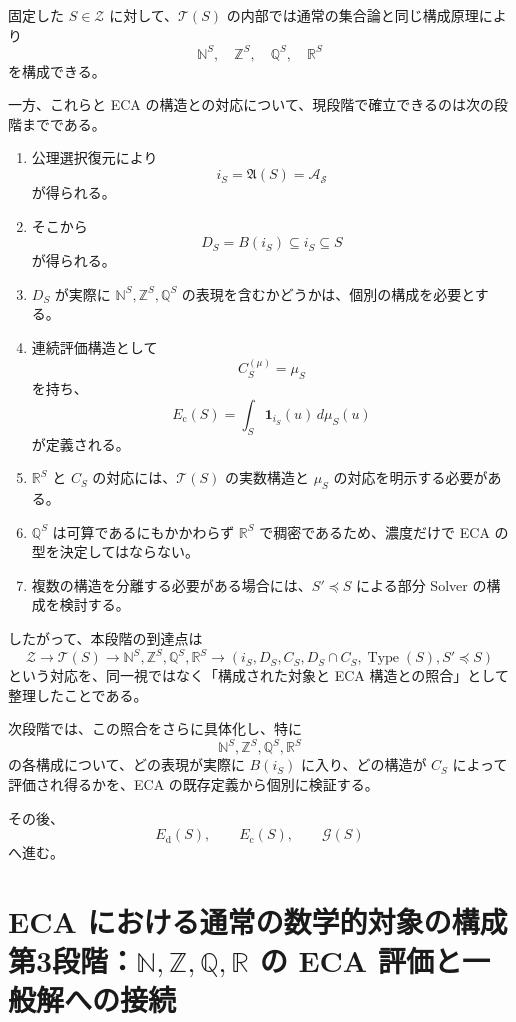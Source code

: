 \documentclass[a4paper,11pt]{article}
\newcommand{\N}{\mathbb{N}}
\newcommand{\Z}{\mathbb{Z}}
\newcommand{\Q}{\mathbb{Q}}
\newcommand{\R}{\mathbb{R}}
\newcommand{\Type}{\operatorname{Type}}
\begin{document}
固定した $S\in\mathcal{Z}$ に対して、$\mathcal{T}(S)$ の内部では通常の集合論と同じ構成原理により
\[
\N^S,\quad\Z^S,\quad\Q^S,\quad\R^S
\]
を構成できる。

一方、これらと ECA の構造との対応について、現段階で確立できるのは次の段階までである。

\begin{enumerate}[label=(\arabic*)]
\item 公理選択復元により
\[
i_S=\mathfrak{A}(S)=\mathcal{A_S}
\]
が得られる。

\item そこから
\[
D_S=B(i_S)\subseteq i_S\subseteq S
\]
が得られる。

\item $D_S$ が実際に $\N^S,\Z^S,\Q^S$ の表現を含むかどうかは、個別の構成を必要とする。

\item 連続評価構造として
\[
C_S^{(\mu)}=\mu_S
\]
を持ち、
\[
E_{\mathrm{c}}(S)
=
\int_S\mathbf1_{i_S}(u)\,d\mu_S(u)
\]
が定義される。

\item $\R^S$ と $C_S$ の対応には、$\mathcal{T}(S)$ の実数構造と $\mu_S$ の対応を明示する必要がある。

\item $\Q^S$ は可算であるにもかかわらず $\R^S$ で稠密であるため、濃度だけで ECA の型を決定してはならない。

\item 複数の構造を分離する必要がある場合には、$S'\preceq S$ による部分 Solver の構成を検討する。
\end{enumerate}

したがって、本段階の到達点は
\[
\boxed{
\mathcal{Z}
\to
\mathcal{T}(S)
\to
\N^S,\Z^S,\Q^S,\R^S
\to
(i_S,D_S,C_S,D_S\cap C_S,\Type(S),S'\preceq S)
}
\]
という対応を、同一視ではなく「構成された対象と ECA 構造との照合」として整理したことである。

次段階では、この照合をさらに具体化し、特に
\[
\N^S,\Z^S,\Q^S,\R^S
\]
の各構成について、どの表現が実際に $B(i_S)$ に入り、どの構造が $C_S$ によって評価され得るかを、ECA の既存定義から個別に検証する。

その後、
\[
E_{\mathrm{d}}(S),
\qquad
E_{\mathrm{c}}(S),
\qquad
\mathcal G(S)
\]
へ進む。



\section{ECA における通常の数学的対象の構成 第3段階：$\mathbb{N},\mathbb{Z},\mathbb{Q},\mathbb{R}$ の ECA 評価と一般解への接続}
\end{document}
